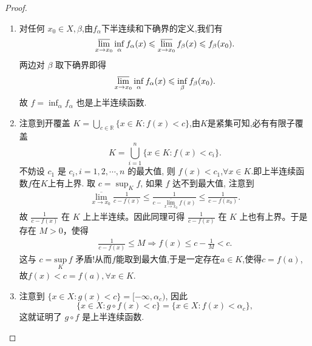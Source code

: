 \documentclass[../../main.tex]{subfiles}%
\begin{document}
\begin{proof}
\begin{enumerate}
\item 对任何 \(x_{0}\in X,\beta\),由$f_{\alpha}$下半连续和下确界的定义,我们有
\[
\varlimsup_{x \to x_{0}}\inf_{\alpha}f_{\alpha}(x)\leqslant \varlimsup_{x \to x_{0}}f_{\beta}(x)\leqslant  f_{\beta}(x_{0}).
\]
两边对 \(\beta\) 取下确界即得
\[
\varlimsup_{x \to x_{0}}\inf_{\alpha}f_{\alpha}(x)\leqslant \inf_{\beta}f_{\beta}(x_{0}).
\]
故 \(f = \inf_{\alpha}f_{\alpha}\) 也是上半连续函数.

\item 注意到开覆盖 \(K=\bigcup_{c\in \mathbb{R}}\{x\in K:f(x)<c\}\),由$K$是紧集可知,必有有限子覆盖
\[
K=\bigcup_{i = 1}^{n}\{x\in K:f(x)<c_{i}\}.
\]
不妨设 \(c_{1}\) 是 \(c_{i},i = 1,2,\cdots,n\) 的最大值, 则 \(f(x)<c_{1}\),\(\forall x\in K\).即上半连续函数$f$在$K$上有上界.  取 \(c=\sup_{K}f\), 如果 \(f\) 达不到最大值, 注意到
\begin{align*}
\underset{x\rightarrow x_0}{\overline{\lim }}\frac{1}{c-f(x)}\leqslant \frac{1}{c-\underset{x\rightarrow x_0}{\overline{\lim }}f(x)}\leqslant \frac{1}{c-f(x_0)}.
\end{align*}
故 $\frac{1}{c-f(x)}$ 在 $K$ 上上半连续。因此同理可得 $\frac{1}{c-f(x)}$ 在 $K$ 上也有上界。于是存在 $M>0$，使得
\begin{align*}
\frac{1}{c-f(x)}\leqslant M \Rightarrow f(x) \leqslant c-\frac{1}{M}<c.
\end{align*}
这与 $c=\underset{K}{\mathrm{sup}}\,f$ 矛盾!从而$f$能取到最大值,于是一定存在$a\in K$,使得$c=f(a)$,故$f(x)<c=f(a),\forall x\in K$.

\item 注意到 \(\{x\in X:g(x)<c\}=[-\infty,\alpha_{c})\), 因此
\[
\{x\in X:g\circ f(x)<c\}=\{x\in X:f(x)<\alpha_{c}\},
\]
这就证明了 \(g\circ f\) 是上半连续函数.
\end{enumerate}
\end{proof}
\end{document}
